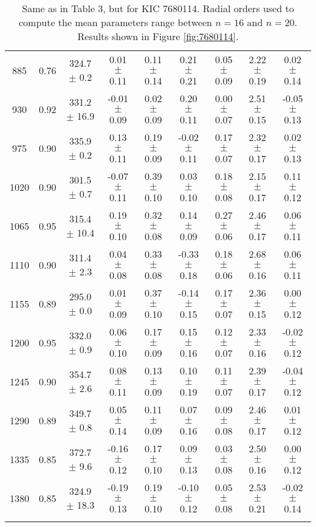 \documentclass[twocolumn]{aastex61}%
\begin{document}
\begin{table*}[ht]
\begin{tabular}{ccc|ccccc|c}
885 & 0.76 & 324.7 $\pm$ 0.2 & 0.01 $\pm$ 0.11 & 0.11 $\pm$ 0.14 & 0.21 $\pm$ 0.21 & 0.05 $\pm$ 0.09 & 2.22 $\pm$ 0.19 & 0.02 $\pm$ 0.14\\
930 & 0.92 & 331.2 $\pm$ 16.9 & -0.01 $\pm$ 0.09 & 0.02 $\pm$ 0.09 & 0.20 $\pm$ 0.11 & 0.00 $\pm$ 0.07 & 2.51 $\pm$ 0.15 & -0.05 $\pm$ 0.13\\
975 & 0.90 & 335.9 $\pm$ 0.2 & 0.13 $\pm$ 0.11 & 0.19 $\pm$ 0.09 & -0.02 $\pm$ 0.11 & 0.17 $\pm$ 0.07 & 2.32 $\pm$ 0.17 & 0.02 $\pm$ 0.13\\
1020 & 0.90 & 301.5 $\pm$ 0.7 & -0.07 $\pm$ 0.11 & 0.39 $\pm$ 0.10 & 0.03 $\pm$ 0.10 & 0.18 $\pm$ 0.08 & 2.15 $\pm$ 0.17 & 0.11 $\pm$ 0.12\\
1065 & 0.95 & 315.4 $\pm$ 10.4 & 0.19 $\pm$ 0.10 & 0.32 $\pm$ 0.08 & 0.14 $\pm$ 0.09 & 0.27 $\pm$ 0.06 & 2.46 $\pm$ 0.17 & 0.06 $\pm$ 0.11\\
1110 & 0.90 & 311.4 $\pm$ 2.3 & 0.04 $\pm$ 0.08 & 0.33 $\pm$ 0.08 & -0.33 $\pm$ 0.18 & 0.18 $\pm$ 0.06 & 2.68 $\pm$ 0.16 & 0.06 $\pm$ 0.11\\
1155 & 0.89 & 295.0 $\pm$ 0.0 & 0.01 $\pm$ 0.09 & 0.37 $\pm$ 0.10 & -0.14 $\pm$ 0.15 & 0.17 $\pm$ 0.07 & 2.36 $\pm$ 0.15 & 0.00 $\pm$ 0.12\\
1200 & 0.95 & 332.0 $\pm$ 0.9 & 0.06 $\pm$ 0.10 & 0.17 $\pm$ 0.09 & 0.15 $\pm$ 0.16 & 0.12 $\pm$ 0.07 & 2.33 $\pm$ 0.16 & -0.02 $\pm$ 0.12\\
1245 & 0.90 & 354.7 $\pm$ 2.6 & 0.08 $\pm$ 0.11 & 0.13 $\pm$ 0.09 & 0.10 $\pm$ 0.19 & 0.11 $\pm$ 0.07 & 2.39 $\pm$ 0.17 & -0.04 $\pm$ 0.12\\
1290 & 0.89 & 349.7 $\pm$ 0.8 & 0.05 $\pm$ 0.14 & 0.11 $\pm$ 0.09 & 0.07 $\pm$ 0.16 & 0.09 $\pm$ 0.08 & 2.46 $\pm$ 0.17 & 0.01 $\pm$ 0.12\\
1335 & 0.85 & 372.7 $\pm$ 9.6 & -0.16 $\pm$ 0.12 & 0.17 $\pm$ 0.10 & 0.09 $\pm$ 0.13 & 0.03 $\pm$ 0.08 & 2.50 $\pm$ 0.16 & 0.00 $\pm$ 0.12\\
1380 & 0.85 & 324.9 $\pm$ 18.3 & -0.19 $\pm$ 0.13 & 0.19 $\pm$ 0.10 & -0.10 $\pm$ 0.12 & 0.05 $\pm$ 0.08 & 2.53 $\pm$ 0.21 & -0.02 $\pm$ 0.14\\\vspace{-0.3cm}
\end{tabular}
\caption{Same as in Table 3, but for KIC 7680114. Radial orders used to compute the mean parameters range between $n=16$ and $n=20$. Results shown in Figure \ref{fig:7680114}.}\label{tab:7680114}\vspace{-1cm}
\end{table*}
\end{document}
